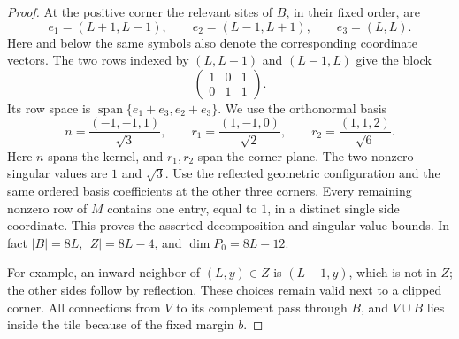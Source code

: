 \begin{proof}
At the positive corner the relevant sites of $B$, in their fixed order,
are
\[
 e_1=(L+1,L-1),\qquad e_2=(L-1,L+1),\qquad e_3=(L,L).
\]
Here and below the same symbols also denote the corresponding coordinate
vectors.  The two rows indexed by $(L,L-1)$ and $(L-1,L)$ give the block
\begin{equation}
 \begin{pmatrix}1&0&1\\0&1&1\end{pmatrix}.
 \label{cell:corner-matrix}
\end{equation}
Its row space is $\operatorname{span}\{e_1+e_3,e_2+e_3\}$. We use the
orthonormal basis
\begin{equation}
 n=\frac{(-1,-1,1)}{\sqrt3},
 \qquad
 r_1=\frac{(1,-1,0)}{\sqrt2},\qquad
 r_2=\frac{(1,1,2)}{\sqrt6}.
 \label{cell:corner-basis}
\end{equation}
Here $n$ spans the kernel, and $r_1,r_2$ span the corner plane. The two
nonzero singular values are $1$ and $\sqrt3$. Use the
reflected geometric configuration and the same ordered basis coefficients
at the other three corners.  Every remaining nonzero row of $M$ contains
one entry, equal to $1$, in a distinct single side coordinate.  This
proves the asserted decomposition and singular-value bounds.  In fact
$|B|=8L$, $|Z|=8L-4$, and $\dim P_0=8L-12$.

For example, an inward neighbor of $(L,y)\in Z$ is $(L-1,y)$, which is
not in $Z$; the other sides follow by reflection.  These choices remain
valid next to a clipped corner.  All connections from $V$ to its
complement pass through $B$, and $V\cup B$ lies inside the tile because
of the fixed margin $b$.
\end{proof}

